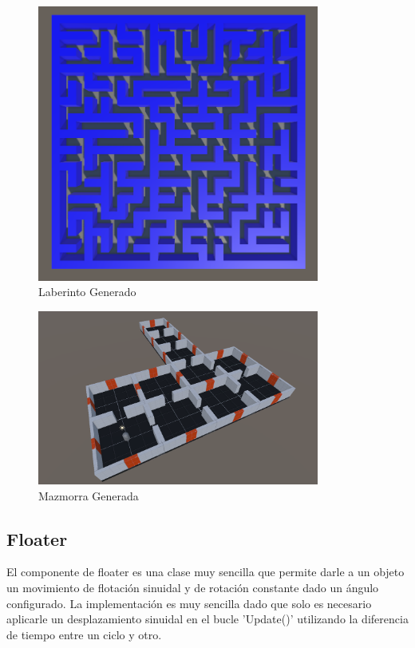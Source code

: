 \begin{figure}[H]
  \centering
    \includegraphics[width=350px,clip=true]{labyrinth_example.png}
  \caption{Laberinto Generado}
  \label{fig:labyrinthExample}
\end{figure}

\begin{figure}[H]
  \centering
    \includegraphics[width=350px,clip=true]{DungeonExample.png}
  \caption{Mazmorra Generada}
  \label{fig:dungeonExample}
\end{figure}

\subsection{Floater}
El componente de floater es una clase muy sencilla que permite darle a un objeto un movimiento de flotación sinuidal y de rotación constante dado un ángulo configurado. La 
implementación es muy sencilla dado que solo es necesario aplicarle un desplazamiento sinuidal en el bucle 'Update()' utilizando la diferencia de tiempo entre un ciclo y otro.

